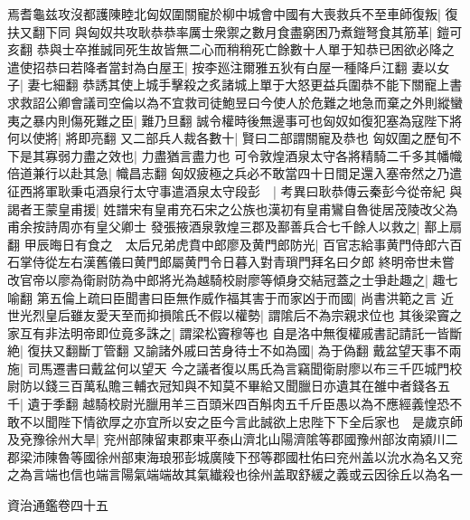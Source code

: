 焉耆龜兹攻沒都護陳睦北匈奴圍關寵於柳中城會中國有大喪救兵不至車師復叛|{
	復扶又翻下同}
與匈奴共攻耿恭恭率厲士衆禦之數月食盡窮困乃煮鎧弩食其筋革|{
	鎧可亥翻}
恭與士卒推誠同死生故皆無二心而稍稍死亡餘數十人單于知恭已困欲必降之遣使招恭曰若降者當封為白屋王|{
	按李廵注爾雅五狄有白屋一種降戶江翻}
妻以女子|{
	妻七細翻}
恭誘其使上城手擊殺之炙諸城上單于大怒更益兵圍恭不能下關寵上書求救詔公卿會議司空倫以為不宜救司徒鮑昱曰今使人於危難之地急而棄之外則縱蠻夷之暴内則傷死難之臣|{
	難乃旦翻}
誠令權時後無邊事可也匈奴如復犯塞為寇陛下將何以使將|{
	將即亮翻}
又二部兵人裁各數十|{
	賢曰二部謂關寵及恭也}
匈奴圍之歷旬不下是其寡弱力盡之效也|{
	力盡猶言盡力也}
可令敦煌酒泉太守各將精騎二千多其幡幟倍道兼行以赴其急|{
	幟昌志翻}
匈奴疲極之兵必不敢當四十日間足還入塞帝然之乃遣征西將軍耿秉屯酒泉行太守事遣酒泉太守段彭　|{
	考異曰耿恭傳云秦彭今從帝紀}
與謁者王蒙皇甫援|{
	姓譜宋有皇甫充石宋之公族也漢初有皇甫鸞自魯徙居茂陵改父為甫余按詩周亦有皇父卿士}
發張掖酒泉敦煌三郡及鄯善兵合七千餘人以救之|{
	鄯上扇翻}
甲辰晦日有食之　太后兄弟虎賁中郎廖及黄門郎防光|{
	百官志給事黄門侍郎六百石掌侍從左右漢舊儀曰黄門郎屬黄門令日暮入對青瑣門拜名曰夕郎}
終明帝世未嘗改官帝以廖為衛尉防為中郎將光為越騎校尉廖等傾身交結冠蓋之士爭赴趣之|{
	趣七喻翻}
第五倫上疏曰臣聞書曰臣無作威作福其害于而家凶于而國|{
	尚書洪範之言}
近世光烈皇后雖友愛天至而抑損隂氏不假以權勢|{
	謂隂后不為宗親求位也}
其後梁竇之家互有非法明帝即位竟多誅之|{
	謂梁松竇穆等也}
自是洛中無復權戚書記請託一皆斷絶|{
	復扶又翻斷丁管翻}
又諭諸外戚曰苦身待士不如為國|{
	為于偽翻}
戴盆望天事不兩施|{
	司馬遷書曰戴盆何以望天}
今之議者復以馬氏為言竊聞衛尉廖以布三千匹城門校尉防以錢三百萬私贍三輔衣冠知與不知莫不畢給又聞臘日亦遺其在雒中者錢各五千|{
	遺于季翻}
越騎校尉光臘用羊三百頭米四百斛肉五千斤臣愚以為不應經義惶恐不敢不以聞陛下情欲厚之亦宜所以安之臣今言此誠欲上忠陛下下全后家也　是歲京師及兗豫徐州大旱|{
	兖州部陳留東郡東平泰山濟北山陽濟隂等郡國豫州部汝南潁川二郡梁沛陳魯等國徐州部東海琅邪彭城廣陵下邳等郡國杜佑曰兖州盖以沇水為名又兖之為言端也信也端言陽氣端端故其氣纎殺也徐州盖取舒緩之義或云因徐丘以為名一}


資治通鑑卷四十五
